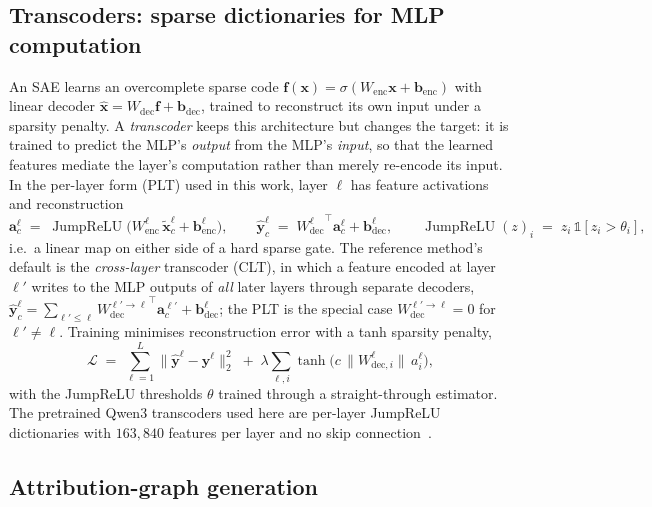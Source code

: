 \documentclass[11pt,a4paper]{article}
\newcommand{\enc}{W_{\mathrm{enc}}}
\newcommand{\dec}{W_{\mathrm{dec}}}
\newcommand{\deci}[2]{W_{\mathrm{dec},#2}^{#1}}   %
\newcommand{\bdec}{\bm{b}_{\mathrm{dec}}}
\newcommand{\benc}{\bm{b}_{\mathrm{enc}}}
\newcommand{\jrelu}{\operatorname{JumpReLU}}
\begin{document}
\subsection{Transcoders: sparse dictionaries for MLP computation}\label{sec:method:tc}

An SAE learns an overcomplete sparse code
$\bm{f}(\bm{x})=\sigma(\enc\bm{x}+\benc)$ with linear decoder
$\hat{\bm{x}}=\dec\bm{f}+\bdec$, trained to reconstruct its own input under a sparsity
penalty. A \emph{transcoder} keeps this architecture but changes the target: it is
trained to predict the MLP's \emph{output} from the MLP's \emph{input}, so that the
learned features mediate the layer's computation rather than merely re-encode its
input. In the per-layer form (PLT) used in this work, layer $\ell$ has feature
activations and reconstruction
\begin{equation}
\bm{a}^{\ell}_{c} \;=\; \jrelu\!\big(\enc^{\ell}\,\tilde{\bm{x}}^{\ell}_{c}+\benc^{\ell}\big),
\qquad
\hat{\bm{y}}^{\ell}_{c} \;=\; {\dec^{\ell}}^{\top} \bm{a}^{\ell}_{c}+\bdec^{\ell},
\qquad
\jrelu(z)_i \;=\; z_i\,\mathbb{1}[z_i>\theta_i],
\label{eq:plt}
\end{equation}
i.e.\ a linear map on either side of a hard sparse gate. The reference method's
default is the \emph{cross-layer} transcoder (CLT), in which a feature encoded at
layer $\ell'$ writes to the MLP outputs of \emph{all} later layers through separate
decoders, $\hat{\bm{y}}^{\ell}_{c}=\sum_{\ell'\le\ell} {\dec^{\ell'\to\ell}}^{\top}
\bm{a}^{\ell'}_{c}+\bdec^{\ell}$; the PLT is the special case
$\dec^{\ell'\to\ell}=0$ for $\ell'\neq\ell$. Training minimises reconstruction error
with a tanh sparsity penalty,
\begin{equation}
\mathcal{L} \;=\; \sum_{\ell=1}^{L}\big\lVert \hat{\bm{y}}^{\ell}-\bm{y}^{\ell} \big\rVert_2^2
\;+\; \lambda \sum_{\ell,i} \tanh\!\big(c\,\lVert \deci{\ell}{i}\rVert\, a^{\ell}_{i}\big),
\end{equation}
with the JumpReLU thresholds $\theta$ trained through a straight-through estimator.
The pretrained Qwen3 transcoders used here are per-layer JumpReLU dictionaries with
$163{,}840$ features per layer and no skip connection~\citep{hanna2025qwen3tc}.

\subsection{Attribution-graph generation}\label{sec:method:attr}
\end{document}

